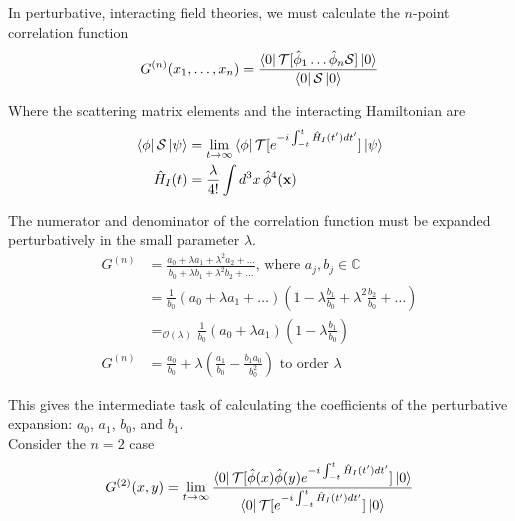 \noindent In perturbative, interacting field theories, we must calculate the $n$-point correlation function
\begin{equation}
G^{(n)}(x_1,\dots,x_n) = \frac{\bra{0} \mathcal{T} [\hat{\phi}_1 \dots \hat{\phi}_n \mathcal{S}]\ket{0}}{\bra{0} \mathcal{S} \ket{0}}
\end{equation}

\noindent Where the scattering matrix elements and the interacting Hamiltonian are
\begin{align}
\bra{\phi} \mathcal{S} \ket{\psi} &= \lim_{t\to\infty} \bra{\phi} \mathcal{T}[e^{-i\int^t_{-t} \hat{H}_I(t')dt'}] \ket{\psi} \\
\hat{H}_I(t) &= \frac{\lambda}{4!} \int d^3 x \,\hat{\phi}^4(\textbf{x})
\end{align}

\noindent The numerator and denominator of the correlation function must be expanded perturbatively in the small parameter $\lambda$. 
\begin{align}
G^{(n)} &= \frac{a_0 + \lambda a_1 + \lambda^2 a_2 + \dots}{b_0 + \lambda b_1 + \lambda^2 b_2 + \dots} \text{, where } a_j, b_j \in \mathbb{C} \\
&= \frac{1}{b_0} (a_0 + \lambda a_1 + \dots) (1 - \lambda \frac{b_1}{b_0} + \lambda^2 \frac{b_2}{b_0} + \dots) \\
&=_{\mathcal{O}(\lambda)} \frac{1}{b_0} (a_0 + \lambda a_1) (1-\lambda \frac{b_1}{b_0}) \\
G^{(n)} &= \frac{a_0}{b_0} + \lambda (\frac{a_1}{b_0} - \frac{b_1 a_0}{b_0^2}) \text{ to order } \lambda
\end{align}

\noindent This gives the intermediate task of calculating the coefficients of the perturbative expansion: $a_0$, $a_1$, $b_0$, and $b_1$. \\

\noindent Consider the $n=2$ case
\begin{equation}
G^{(2)}(x, y) = \lim_{t\to\infty} \frac{\bra{0} \mathcal{T} [\hat{\phi}(x) \hat{\phi}(y) e^{-i\int^t_{-t} \hat{H}_I(t')dt'}]\ket{0}}{\bra{0} \mathcal{T}[e^{-i\int^t_{-t} \hat{H}_I(t')dt'}]\ket{0}}
\end{equation}

